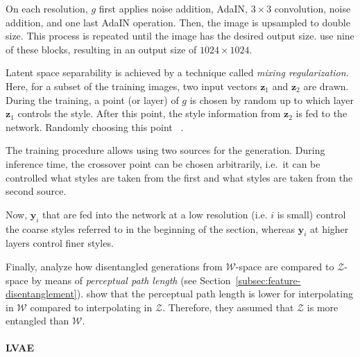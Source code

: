 On each resolution, $g$ first applies noise addition, \ac{AdaIN}, $3\times 3$ convolution, noise addition, and one last \ac{AdaIN} operation.
Then, the image is upsampled to double size.
This process is repeated until the image has the desired output size.
\citet{karras2019style} use nine of these blocks, resulting in an output size of $1024\times 1024$.

Latent space separability is achieved by a technique called \textit{mixing regularization}.
Here, for a subset of the training images, two input vectors $\bm{z}_1$ and $\bm{z}_2$ are drawn.
During the training, a point (or layer) of $g$ is chosen by random up to which layer $\bm{z}_1$ controls the style.
After this point, the style information from $\bm{z}_2$ is fed to the network.
Randomly choosing this point ~\citep{karras2019style}.

The training procedure allows using two sources for the generation.
During inference time, the crossover point can be chosen arbitrarily, i.e.~it can be controlled what styles are taken from the first and what styles are taken from the second source.

Now, $\bm{y}_i$ that are fed into the network at a low resolution (i.e. $i$ is small) control the coarse styles referred to in the beginning of the section, whereas $\bm{y}_i$ at higher layers control finer styles.

Finally, \citet{karras2019style} analyze how disentangled generations from $\mathcal{W}$-space are compared to $\mathcal{Z}$-space by means of \textit{perceptual path length} (see Section~\ref{subsec:feature-disentanglement}).
\citet{karras2019style} show that the perceptual path length is lower for interpolating in $\mathcal{W}$ compared to interpolating in $\mathcal{Z}$.
Therefore, they assumed that $\mathcal{Z}$ is more entangled than $\mathcal{W}$.

\paragraph{\acl{LVAE}}

